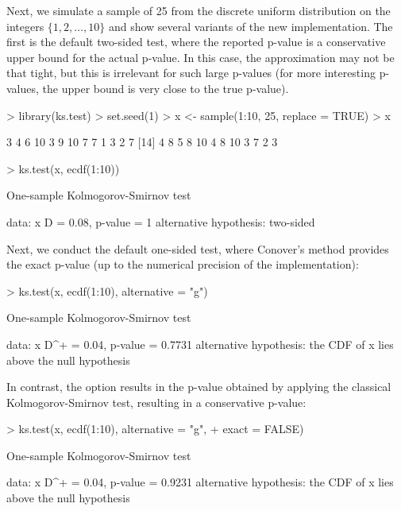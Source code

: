 Next, we simulate a sample of 25 from the discrete uniform distribution on
the integers $\{1, 2, \ldots, 10\}$ and show several variants of the
new  implementation.  The first is the default two-sided test,
where the reported p-value is a conservative upper bound for the actual
p-value.  In this case, the approximation may not be that tight, but this is
irrelevant for such large p-values (for more interesting p-values, the
upper bound is very close to the true p-value).
\begin{Schunk}
\begin{Sinput}
> library(ks.test)
> set.seed(1)
> x <- sample(1:10, 25, replace = TRUE)
> x
\end{Sinput}
\begin{Soutput}
 [1]  3  4  6 10  3  9 10  7  7  1  3  2  7
[14]  4  8  5  8 10  4  8 10  3  7  2  3
\end{Soutput}
\begin{Sinput}
> ks.test(x, ecdf(1:10))
\end{Sinput}
\begin{Soutput}
	One-sample Kolmogorov-Smirnov test

data:  x 
D = 0.08, p-value = 1
alternative hypothesis: two-sided 
\end{Soutput}
\end{Schunk}
Next, we conduct the default one-sided test, where Conover's method
provides the exact p-value (up to the numerical precision of the
implementation):
\begin{Schunk}
\begin{Sinput}
> ks.test(x, ecdf(1:10), alternative = "g")
\end{Sinput}
\begin{Soutput}
	One-sample Kolmogorov-Smirnov test

data:  x 
D^+ = 0.04, p-value = 0.7731
alternative hypothesis:
the CDF of x lies above the null hypothesis 
\end{Soutput}
\end{Schunk}
In contrast, the option  results in the
p-value obtained by applying the classical Kolmogorov-Smirnov
test, resulting in a conservative p-value:
\begin{Schunk}
\begin{Sinput}
> ks.test(x, ecdf(1:10), alternative = "g", 
+         exact = FALSE)
\end{Sinput}
\begin{Soutput}
	One-sample Kolmogorov-Smirnov test

data:  x 
D^+ = 0.04, p-value = 0.9231
alternative hypothesis:
the CDF of x lies above the null hypothesis 
\end{Soutput}
\end{Schunk}

